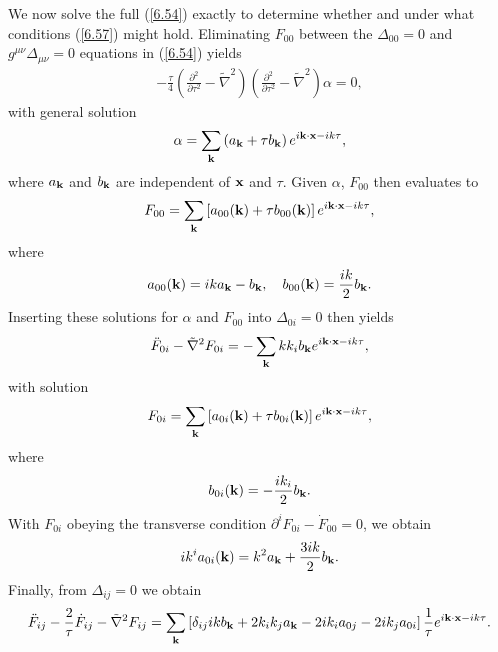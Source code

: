 We now solve the full (\ref{6.54}) exactly  to determine whether and under what conditions (\ref{6.57}) might hold. Eliminating $F_{00}$ between the $\Delta_{00}=0$ and $g^{\mu\nu}\Delta_{\mu\nu}=0$ equations in (\ref{6.54}) yields
%
\begin{eqnarray}
-\frac{\tau}{4}\left(\frac{\partial ^2}{\partial \tau^2}-\tilde{\nabla}^2\right)\left(\frac{\partial ^2}{\partial \tau^2}-\tilde{\nabla}^2\right)\alpha=0,
\label{6.58}
\end{eqnarray}
%
with general solution
%
\begin{eqnarray}
\alpha=\sum_{\bf k}\left(a_{\bf k}+\tau b_{\bf k}\right)e^{i{\bf k}\cdot {\bf x}-ik\tau},
\label{6.59}
\end{eqnarray}
%
where $a_{\bf k}$ and $b_{\bf k}$ are independent of ${\bf x}$ and $\tau$. Given $\alpha$, $F_{00}$ then evaluates to 
%
\begin{eqnarray}
F_{00}=\sum_{\bf k}\left[a_{00}({\bf k})+\tau b_{00}({\bf k})\right]e^{i{\bf k}\cdot {\bf x}-ik\tau},
\label{6.60}
\end{eqnarray}
%
where
%
\begin{eqnarray}
a_{00}({\bf k})=ika_{\bf k}-b_{\bf k},\quad b_{00}({\bf k})=\frac{ik}{2}b_{\bf k}.
\label{6.61}
\end{eqnarray}
%
Inserting these solutions for $\alpha$ and $F_{00}$ into $\Delta_{0i}=0$ then yields
%
\begin{eqnarray}
\ddot{F}_{0i}-\tilde{\nabla}^2F_{0i}=-\sum_{\bf k}kk_ib_{\bf k}e^{i{\bf k}\cdot {\bf x}-ik\tau},
\label{6.62}
\end{eqnarray}
%
with solution 
%
\begin{eqnarray}
F_{0i}=\sum_{\bf k}\left[a_{0i}({\bf k})+\tau b_{0i}({\bf k})\right]e^{i{\bf k}\cdot {\bf x}-ik\tau},
\label{6.63}
\end{eqnarray}
%
where
%
\begin{eqnarray}
b_{0i}({\bf k})=-\frac{ik_i}{2}b_{\bf k}.
\label{6.64}
\end{eqnarray}
%
With $F_{0i}$ obeying the transverse condition $\partial^iF_{0i}-\dot{F}_{00}=0$, we obtain 
%
\begin{eqnarray}
ik^ia_{0i}({\bf k})=k^2a_{\bf k}+\frac{3ik}{2}b_{\bf k}.
\label{6.65}
\end{eqnarray}
%
Finally, from $\Delta_{ij}=0$ we obtain 
%
\begin{eqnarray}
\ddot{F}_{ij}  - \frac{2}{\tau} \dot{F}_{ij} - \tilde{\nabla}^2F_{ij}=
\sum_{\bf k}\left[\delta_{ij}ikb_{\bf k}+2k_ik_ja_{\bf k}-2ik_ia_{0j}-2ik_ja_{0i}\right]\frac{1}{\tau}e^{i{\bf k}\cdot {\bf x}-ik\tau}.
\nonumber\\
\label{6.66}
\end{eqnarray}
